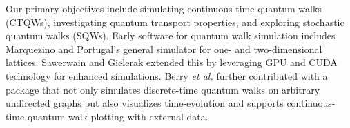 \documentclass[main.tex]{subfiles}
\begin{document}

Our primary objectives include simulating continuous-time quantum walks
(CTQWs), investigating quantum transport properties, and exploring stochastic
quantum walks (SQWs). Early software for quantum walk simulation includes
Marquezino and Portugal's \cite{marquezino2008} general simulator for one- and
two-dimensional lattices. Sawerwain and Gielerak \cite{sawerwain2010} extended
this by leveraging GPU and CUDA technology for enhanced simulations. Berry
\textit{et al.} \cite{berry2011} further contributed with a package that not
only simulates discrete-time quantum walks on arbitrary undirected graphs but
also visualizes time-evolution and supports continuous-time quantum walk
plotting with external data. 
\end{document}
